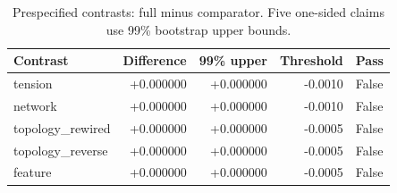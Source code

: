 \begin{table}[H]\centering\small
\caption{Prespecified contrasts: full minus comparator. Five one-sided claims use 99\% bootstrap upper bounds.}
\label{tab:study3-contrasts}
\begin{tabular}{lrrrl}\toprule
Contrast & Difference & 99\% upper & Threshold & Pass \\ \midrule
tension & +0.000000 & +0.000000 & -0.0010 & False \\
network & +0.000000 & +0.000000 & -0.0010 & False \\
topology\_rewired & +0.000000 & +0.000000 & -0.0005 & False \\
topology\_reverse & +0.000000 & +0.000000 & -0.0005 & False \\
feature & +0.000000 & +0.000000 & -0.0005 & False \\
\bottomrule\end{tabular}\end{table}
